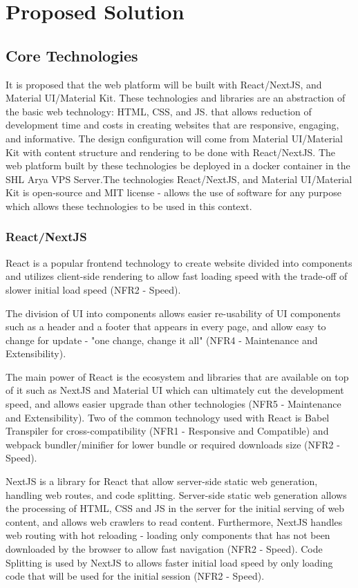 \section{Proposed Solution}
\subsection{Core Technologies}
It is proposed that the web platform will be built with React/NextJS, and Material UI/Material Kit. These technologies and libraries are an abstraction of the basic web technology: HTML, CSS, and JS. that allows reduction of development time and costs in creating websites that are responsive, engaging, and informative. The design configuration will come from Material UI/Material Kit with content structure and rendering to be done with React/NextJS. The web platform built by these technologies be deployed in a docker container in the SHL Arya VPS Server.The technologies React/NextJS, and Material UI/Material Kit is open-source and MIT license - allows the use of software for any purpose which allows these technologies to be used in this context.

\subsubsection{React/NextJS}
React is a popular frontend technology to create website divided into components and utilizes client-side rendering to allow fast loading speed with the trade-off of slower initial load speed (NFR2 - Speed). 

The division of UI into components allows easier re-usability of UI components such as a header and a footer that appears in every page, and allow easy to change for update - "one change, change it all" (NFR4 - Maintenance and Extensibility).

The main power of React is the ecosystem and libraries that are available on top of it such as NextJS and Material UI which can ultimately cut the development speed, and allows easier upgrade than other technologies (NFR5 - Maintenance and Extensibility). Two of the common technology used with React is Babel Transpiler for cross-compatibility (NFR1 - Responsive and Compatible) and webpack bundler/minifier for lower bundle or required downloads size (NFR2 - Speed).

NextJS is a library for React that allow server-side static web generation, handling web routes, and code splitting. Server-side static web generation allows the processing of HTML, CSS and JS in the server for the initial serving of web content, and allows web crawlers to read content. Furthermore, NextJS handles web routing with hot reloading - loading only components that has not been downloaded by the browser to allow fast navigation (NFR2 - Speed). Code Splitting is used by NextJS to allows faster initial load speed by only loading code that will be used for the initial session (NFR2 - Speed). 

